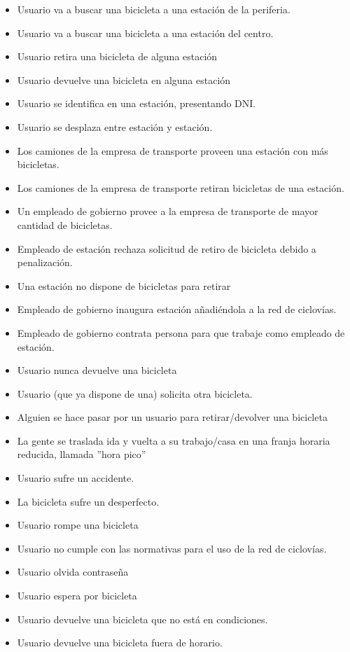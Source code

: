 \begin{itemize}
\item Usuario va a buscar una bicicleta a una estación de la periferia.
\item Usuario va a buscar una bicicleta a una estación del centro.
\item Usuario retira una bicicleta de alguna estación
\item Usuario devuelve una bicicleta en alguna estación
\item Usuario se identifica en una estación, presentando DNI.
\item Usuario se desplaza entre estación y estación.
\item Los camiones de la empresa de transporte proveen una estación con más bicicletas.
\item Los camiones de la empresa de transporte retiran bicicletas de una estación.
\item Un empleado de gobierno provee a la empresa de transporte de mayor cantidad de bicicletas.
\item Empleado de estación rechaza solicitud de retiro de bicicleta debido a penalización.
\item Una estación no dispone de bicicletas para retirar
\item Empleado de gobierno inaugura estación añadiéndola a la red de ciclovías.
\item Empleado de gobierno contrata persona para que trabaje como empleado de estación.
\item Usuario nunca devuelve una bicicleta
\item Usuario (que ya dispone de una) solicita otra bicicleta.
\item Alguien se hace pasar por un usuario para retirar/devolver una bicicleta
\item La gente se traslada ida y vuelta a su trabajo/casa en una franja horaria reducida, llamada ''hora pico''
\item Usuario sufre un accidente.
\item La bicicleta sufre un desperfecto.
\item Usuario rompe una bicicleta
\item Usuario no cumple con las normativas para el uso de la red de ciclovías.
\item Usuario olvida contraseña
\item Usuario espera por bicicleta
\item Usuario devuelve una bicicleta que no está en condiciones.
\item Usuario devuelve una bicicleta fuera de horario.

\end{itemize}
